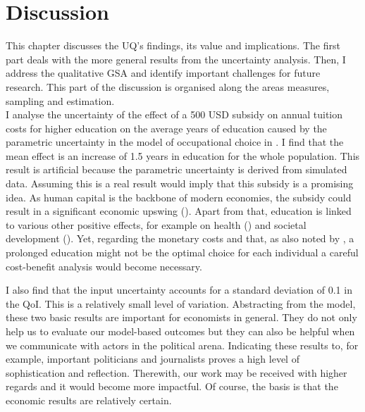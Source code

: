 \section{Discussion}
\thispagestyle{plain}  %

This chapter discusses the UQ's findings, its value and implications. The first part deals with the more general results from the uncertainty analysis. Then, I address the qualitative GSA and identify important challenges for future research. This part of the discussion is organised along the areas measures, sampling and estimation.\\

\noindent
I analyse the uncertainty of the effect of a 500 USD subsidy on annual tuition costs for higher education on the average years of education caused by the parametric uncertainty in the model of occupational choice in \cite{Keane.1994}. I find that the mean effect is an increase of 1.5 years in education for the whole population. This result is artificial because the parametric uncertainty is derived from simulated data. Assuming this is a real result would imply that this subsidy is a promising idea. As human capital is the backbone of modern economies, the subsidy could result in a significant economic upswing (\cite{mincer1984human}). Apart from that, education is linked to various other positive effects, for example on health (\cite{heckman2018returns}) and societal development (\cite{helliwell1999education}). Yet, regarding the monetary costs and that, as also noted by \citeauthor{heckman2018returns}, a prolonged education might not be the optimal choice for each individual a careful cost-benefit analysis would become necessary.

I also find that the input uncertainty accounts for a standard deviation of 0.1 in the QoI. This is a relatively small level of variation. Abstracting from the model, these two basic results are important for economists in general. They do not only help us to evaluate our model-based outcomes but they can also be helpful when we communicate with actors in the political arena. Indicating these results to, for example, important politicians and journalists proves a high level of sophistication and reflection. Therewith, our work may be received with higher regards and it would become more impactful. Of course, the basis is that the economic results are relatively certain.\\

